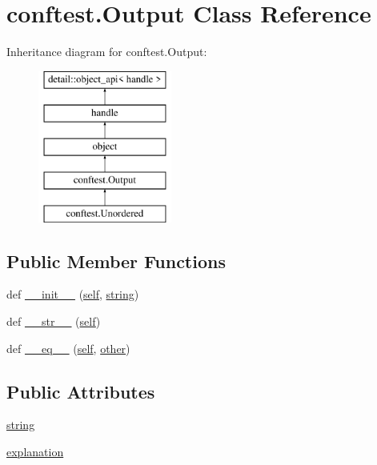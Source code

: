 \hypertarget{classconftest_1_1_output}{}\section{conftest.\+Output Class Reference}
\label{classconftest_1_1_output}
Inheritance diagram for conftest.\+Output\+:\begin{figure}[H]
\begin{center}
\leavevmode
\includegraphics[height=5.000000cm]{classconftest_1_1_output}
\end{center}
\end{figure}
\subsection*{Public Member Functions}
\begin{DoxyCompactItemize}
\item 
def \mbox{\hyperlink{classconftest_1_1_output_a8ac732a0aea5b25f52285c6337d8b80d}{\+\_\+\+\_\+init\+\_\+\+\_\+}} (\mbox{\hyperlink{modsupport_8h_a0180ca1808366e5da641475e8bf8cca3}{self}}, \mbox{\hyperlink{asdl_8h_ae84541b4f3d8e1ea24ec0f466a8c568b}{string}})
\item 
def \mbox{\hyperlink{classconftest_1_1_output_a540ab88cd67674d1d2e33701a64bbcb6}{\+\_\+\+\_\+str\+\_\+\+\_\+}} (\mbox{\hyperlink{modsupport_8h_a0180ca1808366e5da641475e8bf8cca3}{self}})
\item 
def \mbox{\hyperlink{classconftest_1_1_output_af2d5081d359504c97a4e83d316824f05}{\+\_\+\+\_\+eq\+\_\+\+\_\+}} (\mbox{\hyperlink{modsupport_8h_a0180ca1808366e5da641475e8bf8cca3}{self}}, \mbox{\hyperlink{dictobject_8h_abd4733e17e86acb453bda62bc8b96adf}{other}})
\end{DoxyCompactItemize}
\subsection*{Public Attributes}
\begin{DoxyCompactItemize}
\item 
\mbox{\hyperlink{classconftest_1_1_output_a43bd340fe7a7f5aa82b5f2ee4fab03cc}{string}}
\item 
\mbox{\hyperlink{classconftest_1_1_output_a64a26f842f18e50d132ac769f132cfb5}{explanation}}
\end{DoxyCompactItemize}
